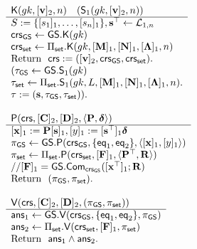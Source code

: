 \begin{figure}
\begin{\algSize}
$$
\begin{array}{l}
\begin{array}{l}
\algK(\gk,[\vecb{v}]_2,n)\quad (\mathsf{S}_1(\gk,[\vecb{v}]_2,n))\\
\hline
S:=\{[s_1]_1,\ldots,[s_n]_1\}, \vecb{s}^\top\gets\distlin_{1,n}\\
\crs_\GS\gets\GS.\algK(\gk)\\
{\crs_\sfset\gets\Pi_\sfset.\algK(\gk,[\matr{M}]_1,[\matr{N}]_1,[\matr{\Lambda}]_1,n)}\\
\text{Return } \ \crs:=([\vecb{v}]_2,\crs_\GS,\crs_\sfset).\\
(\tau_\GS\gets\GS.\algS_1(\gk)\\
\tau_\sfset\gets\Pi_\sfset.\algS_1(\gk,L,[\matr{M}]_1,[\matr{N}]_1,[\matr{\Lambda}]_1,n).\\
\tau := (\vecb{s},\tau_\GS,\tau_\sfset)).\\
\\
\end{array}
\\
\begin{array}{l}
{\algP(\crs, [\matr{C}]_2, [\matr{D}]_2,\langle \matr{P}, \grkb{\delta}\rangle)}\\
\hline
[\vecb{x}]_1 := \matr{P}[\vecb{s}]_1,
[y]_1 := [\vecb{s}^\top]_1\grkb{\delta}\\
\pi_\GS\gets\GS.\algP(\crs_\GS,\{\eq_1,\eq_2\},\langle[\vecb{x}]_1,[y]_1\rangle)\\
\pi_\sfset \gets \Pi_\sfset.\algP(\crs_\sfset, [\matr{F}]_1,\langle\matr{P}^\top,\matr{R}\rangle)\\
//{[\matr{F}]_1} = \GS.\Com_{\crs_\GS}([\vecb{x}^\top]_1;\matr{R})\\
\text{Return } \  (\pi_\GS,\pi_\sfset). \\
\\
\end{array}\\
\begin{array}{l}
{\algV(\crs,[\matr{C}]_2,[\matr{D}]_2,(\pi_\GS,\pi_\sfset))}\\
\hline
\mathsf{ans}_1 \gets \GS.\algV(\crs_\GS,\{\eq_1,\eq_2\},\pi_\GS)\\
\mathsf{ans}_2 \gets \Pi_\sfset.\algV(\crs_\sfset,[\matr{F}]_1,\pi_\sfset)\\
\text{Return } \ \mathsf{ans}_1\wedge\mathsf{ans}_2.
\\

\end{array}
\end{array}$$
\end{\algSize}
\end{figure}
